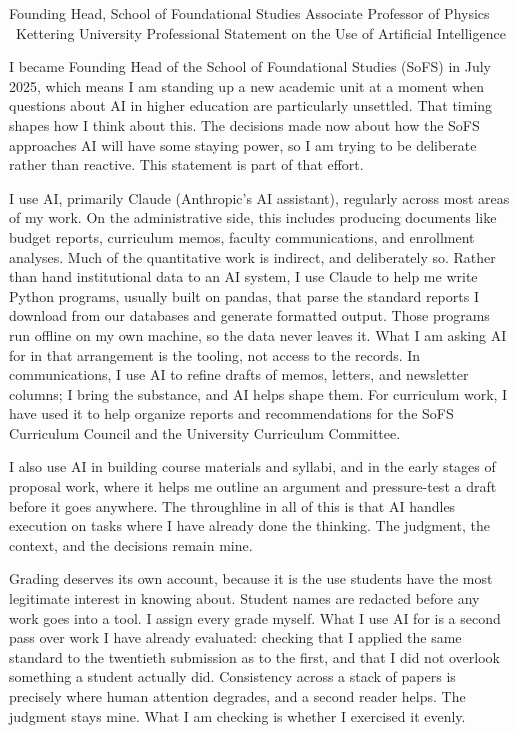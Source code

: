 \documentclass[10pt]{article}
\begin{document}
\statementheader
  {Founding Head, School of Foundational Studies}
  {Associate Professor of Physics \textperiodcentered\ Kettering University}
  {Professional Statement on the Use of Artificial Intelligence}



I became Founding Head of the School of Foundational Studies (SoFS) in July 2025, which means I
am standing up a new academic unit at a moment when questions about AI in higher education are
particularly unsettled. That timing shapes how I think about this. The decisions made now about
how the SoFS approaches AI will have some staying power, so I am trying to be deliberate rather
than reactive. This statement is part of that effort.


I use AI, primarily Claude (Anthropic's AI assistant), regularly across most areas of my work.
On the administrative side, this includes producing documents like budget reports, curriculum
memos, faculty communications, and enrollment analyses. Much of the quantitative work is
indirect, and deliberately so. Rather than hand institutional data to an AI system, I use
Claude to help me write Python programs, usually built on pandas, that parse the standard
reports I download from our databases and generate formatted output. Those programs run offline
on my own machine, so the data never leaves it. What I am asking AI for in that arrangement is
the tooling, not access to the records. In communications, I use AI
to refine drafts of memos, letters, and newsletter columns; I bring the substance, and AI helps
shape them. For curriculum work, I have used it to help organize reports and recommendations
for the SoFS Curriculum Council and the University Curriculum Committee.

I also use AI in building course materials and syllabi, and in the early stages of proposal
work, where it helps me outline an argument and pressure-test a draft before it goes anywhere.
The throughline in all of this is that AI handles execution on tasks where I have already done
the thinking. The judgment, the context, and the decisions remain mine.

Grading deserves its own account, because it is the use students have the most legitimate
interest in knowing about. Student names are redacted before any work goes into a tool. I assign
every grade myself. What I use AI for is a second pass over work I have already evaluated:
checking that I applied the same standard to the twentieth submission as to the first, and that
I did not overlook something a student actually did. Consistency across a stack of papers is
precisely where human attention degrades, and a second reader helps. The judgment stays mine.
What I am checking is whether I exercised it evenly.
\end{document}
